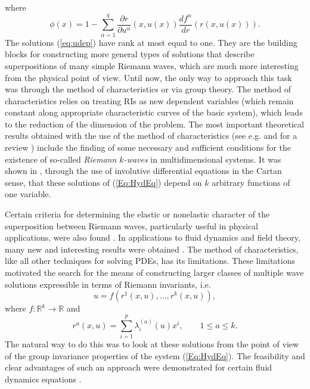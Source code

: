 \documentclass{birkjour}
\theoremstyle{definition}
\theoremstyle{remark}
\numberwithin{equation}{section}
\numberwithin{equation}{section}
\numberwithin{thm}{section}
\numberwithin{equation}{section}
\numberwithin{thm}{section}
\begin{document}
where 
$$
\phi(x)=1-\sum_{\alpha=1}^q\frac{\partial r}{\partial u^\alpha}(x,u(x))\frac{df^{\alpha}}{dr}(r(x,u(x))).%
$$
The solutions (\ref{eq:udep}) have rank at most equal to one. They are the building blocks for constructing more general types of solutions that describe superpositions of many simple Riemann waves, which are much more interesting from the physical point of view. Until now, the only way to approach  this task was through the method of characteristics or via group theory. The method of characteristics relies on treating RIs as new dependent variables (which remain constant along appropriate characteristic curves of the basic system), which leads to the reduction of the dimension of the problem. The most important theoretical results obtained with the use of the method of characteristics (see e.g. \cite{CH62,HK89,Je76,JK84,Pe85,RJ83} and \cite{Wh74}  for a review%
) include the finding of some necessary and sufficient conditions for the existence of  so-called {\it Riemann $k$-waves} in multidimensional systems. It was shown in \cite{Ca53,Pe71,Pe85}, through the use of involutive differential equations in the Cartan sense, that these solutions of (\ref{Eq:HydEq}) depend on $k$ arbitrary functions of one variable. 

Certain criteria for determining the elastic or nonelastic character of the superposition between Riemann waves, particularly useful in physical applications, were also found \cite{Je76,Pe85,RJ83}. In applications to fluid dynamics and field theory, many new and interesting results were obtained \cite{Bo65,DG96,FK04,GL14,RJ83,Tr62}. The method of characteristics, like all other techniques for  solving PDEs, has its limitations. These limitations motivated the search for the means of constructing larger classes of multiple wave solutions expressible in terms of Riemann invariants, i.e.
\begin{equation}
	\label{Eq:Sol}
	u=f\left(r^{1}(x,u),\ldots,r^{k}(x,u)\right),
\end{equation}
where $f:\mathbb{R}^k\rightarrow \mathbb{R}$ and
$$
r^{a}(x,u)=\sum_{i=1}^p\lambda^{(a)}_i(u)x^i,\qquad 1\leq a\leq k.
$$
The natural way to do this was to look at these solutions from the point of view of the group invariance properties of the system (\ref{Eq:HydEq}).  The feasibility and clear advantages of such an approach were demonstrated for certain fluid dynamics equations \cite{DG96,GT96}.
\end{document}
